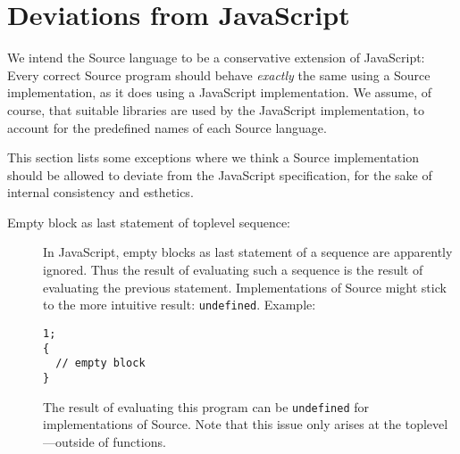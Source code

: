 \section*{Deviations from JavaScript}

We intend the 
Source language to be a conservative extension
of JavaScript: Every correct
Source program should behave \emph{exactly} the same
using a Source implementation, as it does using a JavaScript
implementation. We assume, of course, that suitable libraries are
used by the JavaScript implementation, to account for the predefined names
of each Source language.

This section lists some exceptions where we think a Source implementation
should be allowed to deviate from the JavaScript specification, for the
sake of internal consistency and esthetics.

\begin{description}
\item[Empty block as last statement of toplevel sequence:] In JavaScript,
  empty blocks as last statement of a sequence are apparently
  ignored. Thus the result of evaluating such a sequence is the
  result of evaluating the previous statement. Implementations
  of Source might stick to the more intuitive result: \texttt{undefined}.
  Example:
  \begin{lstlisting}
1;
{
  // empty block
}
  \end{lstlisting}
  The result of evaluating this program can be \texttt{undefined}
  for implementations of Source. Note that this issue only arises
  at the toplevel---outside of functions. 
\end{description}
